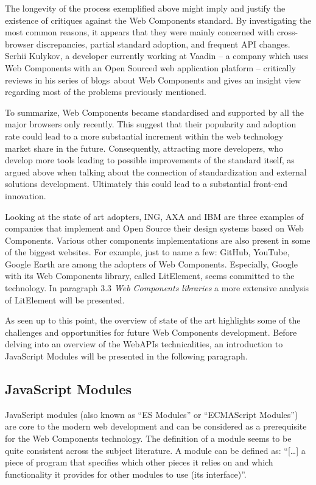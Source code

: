 The longevity of the process exemplified above might imply and justify the existence of critiques against the Web Components standard. By investigating the most common reasons, it appears that they were mainly concerned with cross-browser discrepancies, partial standard adoption, and frequent API changes. Serhii Kulykov, a developer currently working at Vaadin – a company which uses Web Components with an Open Sourced web application platform – critically reviews in his series of blogs\, about Web Components and gives an insight view regarding most of the problems previously mentioned.

To summarize, Web Components became standardised and supported by all the major browsers only recently. This suggest that their popularity and adoption rate could lead to a more substantial increment within the web technology market share in the future. Consequently, attracting more developers, who develop more tools leading to possible improvements of the standard itself, as argued above when talking about the connection of standardization and external solutions development. Ultimately this could lead to a substantial front-end innovation.

Looking at the state of art adopters, ING, AXA and IBM are three examples of companies that implement and Open Source their design systems based on Web Components. Various other components implementations are also present in some of the biggest websites. For example, just to name a few: GitHub, YouTube, Google Earth are among the adopters of Web Components. Especially, Google with its Web Components library, called LitElement, seems committed to the technology. In paragraph 3.3 \emph{Web Components libraries} a more extensive analysis of LitElement will be presented.

As seen up to this point, the overview of state of the art highlights some of the challenges and opportunities for future Web Components development. Before delving into an overview of the WebAPIs technicalities, an introduction to JavaScript Modules will be presented in the following paragraph.

\subsection{JavaScript Modules}
\label{subsec:jSModules}

JavaScript modules (also known as “ES Modules” or “ECMAScript Modules”) are core to the modern web development and can be considered as a prerequisite for the Web Components technology. The definition of a module seems to be quite consistent across the subject literature. A module can be defined as: “[…] a piece of program that specifies which other pieces it relies on and which functionality it provides for other modules to use (its interface)”.

